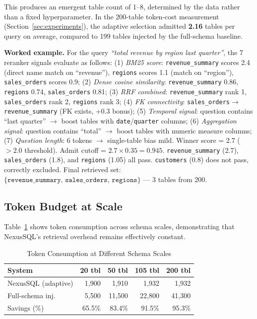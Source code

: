 \documentclass[conference]{IEEEtran}
\begin{document}
This produces an emergent table count of 1--8, determined by the data
rather than a fixed hyperparameter. In the 200-table token-cost
measurement (Section~\ref{sec:experiments}), the adaptive selection
admitted \textbf{2.16} tables per query on average, compared to 199
tables injected by the full-schema baseline.

\textbf{Worked example.}
For the query \emph{``total revenue by region last quarter''},
the 7 reranker signals evaluate as follows:
(1) \textit{BM25 score}: \texttt{revenue\_summary} scores 2.4 (direct name match on ``revenue''), \texttt{regions} scores 1.1 (match on ``region''), \texttt{sales\_orders} scores 0.9;
(2) \textit{Dense cosine similarity}: \texttt{revenue\_summary} 0.86, \texttt{regions} 0.74, \texttt{sales\_orders} 0.81;
(3) \textit{RRF combined}: \texttt{revenue\_summary} rank 1, \texttt{sales\_orders} rank 2, \texttt{regions} rank 3;
(4) \textit{FK connectivity}: \texttt{sales\_orders}$\to$\texttt{revenue\_summary} (FK exists, +0.3 bonus);
(5) \textit{Temporal signal}: question contains ``last quarter'' $\to$ boost tables with \texttt{date}/\texttt{quarter} columns;
(6) \textit{Aggregation signal}: question contains ``total'' $\to$ boost tables with numeric measure columns;
(7) \textit{Question length}: 6 tokens $\to$ single-table bias mild.
Winner score = 2.7 ($> 2.0$ threshold). Admit cutoff = $2.7 \times 0.35 = 0.945$.
\texttt{revenue\_summary} (2.7), \texttt{sales\_orders} (1.8), and \texttt{regions} (1.05) all pass.
\texttt{customers} (0.8) does not pass, correctly excluded.
Final retrieved set: $\{\texttt{revenue\_summary},\,\texttt{sales\_orders},\,\texttt{regions}\}$ --- 3 tables from 200.

\subsection{Token Budget at Scale}

Table~\ref{tab:token_scale} shows token consumption across schema scales,
demonstrating that NexusSQL's retrieval overhead remains effectively constant.

\begin{table}[!htb]
\caption{Token Consumption at Different Schema Scales}
\label{tab:token_scale}
\centering
\small
\begin{tabular}{lrrrr}
\toprule
\textbf{System} & \textbf{20 tbl} & \textbf{50 tbl} & \textbf{105 tbl} & \textbf{200 tbl} \\
\midrule
NexusSQL (adaptive) & 1,900  & 1,910  & 1,932  & 1,932  \\
Full-schema inj.   & 5,500  & 11,500 & 22,800 & 41,300 \\
\midrule
Savings (\%)       & 65.5\% & 83.4\% & 91.5\% & 95.3\% \\
\bottomrule
\end{tabular}
\end{table}
\end{document}
